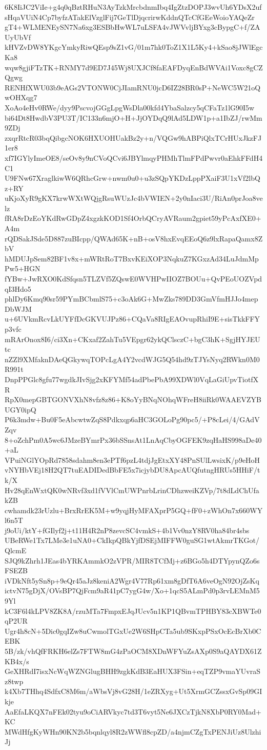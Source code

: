 6K8IiJC2ViIe+g4q0qBztRHuN3AyTzkMrcbdnmIbq4IgZtzDOPJ3wvUh6YDsX2uf
sHqaVUiN4Cp7byfzATakElVzglFij7GeTlDjqcrirwKddnQTcCfGEeWoioYAQeZr
gT4+WLMENEySN7Na6xg3ESBbHwWL7uLSFA4vJWVvljBYxg3cBypgC+f/ZAUyUbVf
kHVZvDW8YKgcYmkyRiwQEsp9sZ1vG/01m7hk0ToZ1X1L5Ky4+kSao8jJWlEgcKa8
wqw8gjiFTzTK+RNMY7d9ED7J45Wj8UXJCf8faEAFDyqEnBdWVAi1Voxc8gCZQgwg
RENHfXWU03b9eAGs2VTONW0CjJIamRNU0jcD6IZ28BR0sP+NeWC5W21oQwOHXqg7
XoAo4eHv0RWe/dyy9PscvojGGgLpgWsDla00kfd4YbaSalzcy5qCFaTz1lG90I5w
bi64Dt8HwdbV3PU3T/IC133n6mjO+H+JjOYDqQ9lAd5LDW1p+a1IbZJ/rwMm9ZDj
zxqrRtcR03bqQibgcNOK6HXUOHUakBz2y+n/VQGw9hABPiQlxTCrHUxJkzFJ1er8
xf7IGYlyImeOE8/seOv8y9nCVoQCvi6JBYlmqyPHMhTlmFPdPwvr0aEhkFFdH4C1
U9FNw67XraglkiwW6QRhcGrw+nwm0u0+u3zSQpYKDzLppPXaiF3U1xVf2lbQz+RY
uKjoXyR9gKX7krwWXtWQjgRsuWUzJc4bVWIEN+2y0nIaci3U/RiAn0prJoa8velz
fRA8rDzEoYKdRwGDpZ4xgzkKOD1Sf4OrbQCryAVRaum2gpiet59yPcAxfXE0+A4m
rQDSakJSde5D887zuBIcpp/QWAd65K+nB+osV8hxEvqEEoQ6z9lxRapaQamx8ZbV
hMDUJpSem82BF1v8x+mWRtRoT7BxvKEiXOP3NqkuZ7KGxzAd34LuJdmMpPw5+HGN
fYBw+JwRXO0KdSfqsn5TLZVf5ZQswE0WVHPwIIOZ7BOUu+QvPEoUOZVpdqI3Hdo5
phlDy6Kmq90sr59PYmBCbmlS75+c3oAk6G+MwZks789DD3GmVfmHJJo4mepDbWJM
u+6UVkmRcvLkUYFfDcGKVUJPz86+CQaVa8RIgEAOvupRhiI9E+sisTkkFFYp3vfc
mRArOnox8I6/ci3Xn+CKxaf2ZahTu5VEpgr62ykQClsczC+bgC3hK+SgjHYJEUtc
nZZl9XMfaknDAeQGkywqTOPcLgA4Y2vcdWJG5Q54hd9zTJYsNyq2RWkn0M0R991t
DnpPPGlc8gfu77wgdkJIvSjg2xKFYMf54adPbePbA99XDWl0VqLaGiUpvTiotfXR
RpX0mepGBTGONVXhN8vfz8z86+K8oYyBNqNOhqWFreH8iiRk0WAAEVZYBUGY0ipQ
P6k3mdw+Bu0F5eAbcwtwZqS8Pdkxqp6aHC3GOLoPg90pc5/+P8cLei/4/GAdVZqv
8+oZchPm0A5wc6JMzeBYmrPx36bSSnsAt1LnAqCbyOGFEK9zqHaHS998aDe40+aL
VPuiNGlYOpRd7858sdahm8en3ePTf6pzL4tdjJgEtxXY48PnSUlLwsixK/p9eHoH
vNYHbVEj18H2QT7tuEADIDedBbFE5x7icjybDU8ApcAUQfutngHRUs5HHiF/tk/X
Hv28qEnWxtQK0wNRvf3xd1fVVlCmUWPnrbLrinCDhzweiKZVp/7t8dLdChUfakZB
cwhamdk23rUzlu+BrxRrEK5M+w9yqjHyMFAXprP5GQ+fF0+zWhOn7x660WYl6n5T
j9oUi/ktY+fGIlyf2j+t11H4R2nP8zevcSC4vmkS+4b1Vv0nzY8RV0ha84br4sbs
UBeRWe1Tx7LMe3e1uNA0+CkIkpQBkYjfDSEjMIFFW0guSG1wtAkmrTKGot/QlcmE
SJQ9kZhrh1JEas4bYRKAmmkO2zVPR/MIR8TCfMj+z6BGo5h4DTYpynQZo6sFSEZB
iVDkNft5ySn8p+9eQr45aJz8keniA2Wgr4V77Rp61xm8gDfT6A6veOgN92OjZsKq
ictvN75gDjX/OVsBP7QjFcm9aR41pC7ygG4w/Xo+1qcS5ALmPd0p3rvLEMnM59Yl
kC3F6l4kLPV8ZK8A/rzuMTa7FmpxEJqJUcv5n1KP1QBvmTPHBY83cXBWTe0qP2UR
Ugr4h8cN+5Dic0gqIZw8uCwmolTGxUe2W6SHpCTa5ub9SKxpPSxOcEcBrXb0CEBK
5B/zk/vhQfFRKH6elZs7FTW8mG4zPaOCM8XDnWFYuZsAXp0S9aQAYDX61ZKB4x/s
GeXHRdI7isxNcWqWZNGlugBHH9zgkKdB3EaHUX3FSin+eqTZP9vmaYUvraSz8twp
k4Xb7THhq4SdfxC8M6m/aWbsVj8vG28H/1eZRXyg+Ut5XrmGCZssxGvSp09GIkje
AaEfaLKQX7nFEk02tyu9oCiARVkyc7td3T6vyt5Ne6JXCzTjkN8XbP0RY0Mad+KC
MWdHfgKyWHn90KN2b5bqnlqyl8R2zWWfl8cpZD/a4njmCZgTxPENJiUz8UlzhiJj
